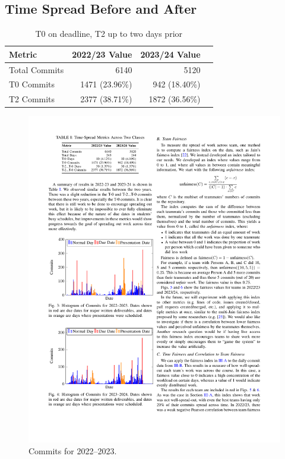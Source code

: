 \documentclass[poster, a1, plainboxedsections]{sciposter}
\begin{document}
\begin{multicols}{2}

\section{Time Spread Before and After}

\begin{table}
\caption{T0 on deadline, T2 up to two days prior}
\centering
\begin{tabular}{@{}lrrr@{}}
\toprule
\textbf{Metric} & \textbf{2022/23 Value} & \textbf{2023/24 Value} \\ 
\midrule
Total Commits & 6140 & 5120 \\
T0 Commits & 1471 (23.96\%) & 942 (18.40\%) \\
T2 Commits & 2377 (38.71\%) & 1872 (36.56\%) \\ 
\bottomrule
\end{tabular}
\end{table}

\begin{figure}[h!]
\centering
\includegraphics[width=0.7\linewidth]{../figures/HistCommits2022-23.pdf}
\caption{Commits for 2022--2023.}\label{Fig_22_23Timeline}
\end{figure}


\end{multicols}
\end{document}
